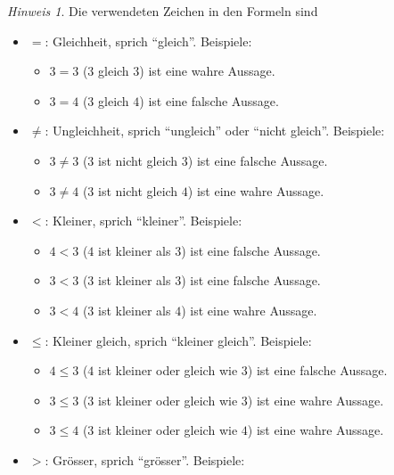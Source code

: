 \documentclass[
]{book}
\providecommand{\tightlist}{%
  \setlength{\itemsep}{0pt}\setlength{\parskip}{0pt}}
\theoremstyle{definition}
\theoremstyle{definition}
\theoremstyle{definition}
\theoremstyle{definition}
\theoremstyle{remark}
\newtheorem*{remark}{Hinweis}
\begin{document}
\begin{caution}

\begin{remark}

Die verwendeten Zeichen in den Formeln sind

\begin{itemize}
\tightlist
\item
  \(=\): Gleichheit, sprich ``gleich''. Beispiele:

  \begin{itemize}
  \tightlist
  \item
    \(3 = 3\) (\(3\) gleich \(3\)) ist eine wahre Aussage.
  \item
    \(3 = 4\) (\(3\) gleich \(4\)) ist eine falsche Aussage.
  \end{itemize}
\item
  \(\neq\): Ungleichheit, sprich ``ungleich'' oder ``nicht gleich''. Beispiele:

  \begin{itemize}
  \tightlist
  \item
    \(3 \neq 3\) (\(3\) ist nicht gleich \(3\)) ist eine falsche Aussage.
  \item
    \(3 \neq 4\) (\(3\) ist nicht gleich \(4\)) ist eine wahre Aussage.
  \end{itemize}
\item
  \(<\): Kleiner, sprich ``kleiner''. Beispiele:

  \begin{itemize}
  \tightlist
  \item
    \(4 < 3\) (\(4\) ist kleiner als \(3\)) ist eine falsche Aussage.
  \item
    \(3 < 3\) (\(3\) ist kleiner als \(3\)) ist eine falsche Aussage.
  \item
    \(3 < 4\) (\(3\) ist kleiner als \(4\)) ist eine wahre Aussage.
  \end{itemize}
\item
  \(\leq\): Kleiner gleich, sprich ``kleiner gleich''. Beispiele:

  \begin{itemize}
  \tightlist
  \item
    \(4 \leq 3\) (\(4\) ist kleiner oder gleich wie \(3\)) ist eine falsche Aussage.
  \item
    \(3 \leq 3\) (\(3\) ist kleiner oder gleich wie \(3\)) ist eine wahre Aussage.
  \item
    \(3 \leq 4\) (\(3\) ist kleiner oder gleich wie \(4\)) ist eine wahre Aussage.
  \end{itemize}
\item
  \(>\): Grösser, sprich ``grösser''. Beispiele:


\end{itemize}
\end{remark}
\end{caution}
\end{document}

